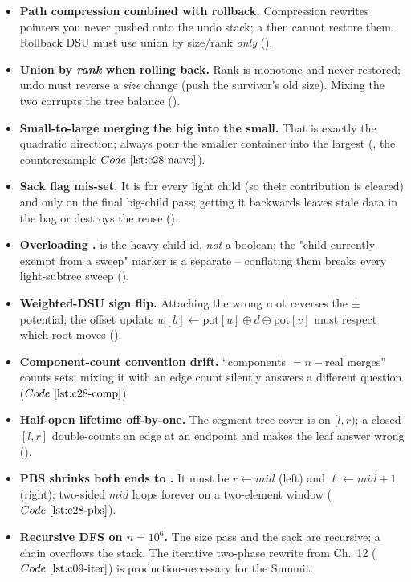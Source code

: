 \begin{itemize}[nosep, leftmargin=1.4em]
  \item \textbf{Path compression combined with rollback.} Compression rewrites
         pointers you never pushed onto the undo stack; a
         then cannot restore them. Rollback DSU must use union by
        size/rank \emph{only} ().
  \item \textbf{Union by \emph{rank} when rolling back.} Rank is monotone and
        never restored; undo must reverse a \emph{size} change (push the
        survivor's old size). Mixing the two corrupts the tree balance
        ().
  \item \textbf{Small-to-large merging the big into the small.} That is exactly
        the quadratic direction; always pour the smaller container into the
        largest (, the counterexample \(\coderef{c28-naive}\)).
  \item \textbf{Sack  flag mis-set.} It is  for every
        light child (so their contribution is cleared) and  only on
        the final big-child pass; getting it backwards leaves stale data in the
        bag or destroys the reuse ().
  \item \textbf{Overloading .}  is the heavy-child id,
        \emph{not} a boolean; the "child currently exempt from a sweep" marker
        is a separate  -- conflating them breaks every
        light-subtree sweep ().
  \item \textbf{Weighted-DSU sign flip.} Attaching the wrong root reverses the
        \(\pm\) potential; the offset update \(w[b] \leftarrow \text{pot}[u]\oplus
        d\oplus\text{pot}[v]\) must respect which root moves ().
  \item \textbf{Component-count convention drift.} ``components \(=n-\)real
        merges'' counts sets; mixing it with an edge count silently answers
        a different question (\(\coderef{c28-comp}\)).
  \item \textbf{Half-open lifetime off-by-one.} The segment-tree cover is on
        \([l,r)\); a closed \([l,r]\) double-counts an edge at an endpoint and
        makes the leaf answer wrong ().
  \item \textbf{PBS shrinks both ends to .} It must be \(r\leftarrow
        \mathit{mid}\) (left) and \(\ell\leftarrow\mathit{mid}+1\) (right);
        two-sided \(\mathit{mid}\) loops forever on a two-element window
        (\(\coderef{c28-pbs}\)).
  \item \textbf{Recursive DFS on \(n=10^6\).} The size pass and the sack are
        recursive; a chain overflows the stack. The iterative two-phase rewrite
        from Ch.~12 (\(\coderef{c09-iter}\)) is production-necessary for the
        Summit.
\end{itemize}

